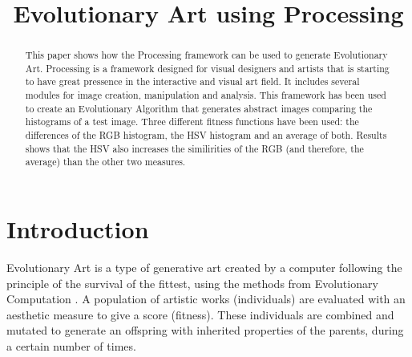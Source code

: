 \documentclass[conference]{IEEEtran}
\begin{document}
\title{Evolutionary Art using Processing}
\author{
\and
{}
\and
{}
\and
{}
\and
{}
}

\maketitle

\begin{abstract}
This paper shows how the Processing framework can be used to generate Evolutionary Art. Processing is a framework designed for visual designers and artists that is starting to have great pressence in the interactive and visual art field. It includes several modules for image creation, manipulation and analysis. This framework has been used to create an Evolutionary Algorithm that generates abstract images comparing the histograms of a test image. Three different fitness functions have been used: the differences of the RGB histogram, the HSV histogram and an average of both. Results shows that the HSV also increases the similirities of the RGB (and therefore, the average) than the other two measures.
\end{abstract}

\section{Introduction}\label{intro}
Evolutionary Art \cite{EART} is a type of generative art created by a computer following the principle of the survival of the fittest, using the methods from Evolutionary Computation \cite{INTROEIBEN}. A population of artistic works (individuals) are evaluated with an aesthetic measure to give a score (fitness). These individuals are combined and mutated to generate an offspring with inherited properties of the parents, during a certain number of times.
\end{document}
